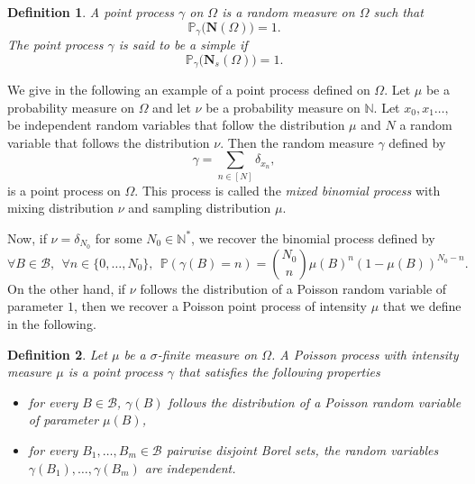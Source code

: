 \documentclass[twoside,11pt]{book}
\newtheorem{definition}{Definition}
\newtheorem{example}{Example}
\numberwithin{theorem}{chapter}
\numberwithin{definition}{chapter}
\numberwithin{proposition}{chapter}
\numberwithin{corollary}{chapter}
\numberwithin{example}{chapter}
\numberwithin{lemma}{chapter}
\begin{document}
\begin{definition}
A point process $\gamma$ on $\Omega$ is a random measure on $\Omega$ such that
\begin{equation}
\mathbb{P}_{\gamma} \big(\mathbf{N} (\Omega ) \big) = 1.
\end{equation}
The point process $\gamma$ is said to be a simple if 
\begin{equation}
\mathbb{P}_{\gamma}\big(\mathbf{N}_{s}(\Omega)\big) = 1.
\end{equation}

\end{definition}

We give in the following an example of a point process defined on $\Omega$. Let $\mu$ be a probability measure on $\Omega$ and let $\nu$ be a probability measure on $\mathbb{N}$. Let $x_{0}, x_{1} \dots, $ be independent random variables that follow the distribution $\mu$ and $N$ a random variable that follows the distribution $\nu$.
Then the random measure $\gamma$ defined by
\begin{equation}
\gamma = \sum\limits_{n \in [N]} \delta_{x_{n}},
\end{equation}
is a point process on $\Omega$. This process is called the \emph{mixed binomial process} with mixing distribution $\nu$ and sampling distribution $\mu$.

Now, if  $\nu = \delta_{N_0}$ for some $N_0 \in \mathbb{N}^{*}$, we recover the binomial process defined by
\begin{equation}\label{eq:binomial_cylinder_prb}
\forall B \in \mathcal{B}, \:\:\forall n \in \{0, \dots, N_0\}, \:\: \mathbb{P}(\gamma(B) = n) = \binom{N_0}{n}\mu(B)^{n}(1-\mu(B))^{N_0-n}.
\end{equation}
On the other hand, if $\nu$ follows the distribution of a Poisson random variable of parameter $1$, then we recover a Poisson point process of intensity $\mu$ that we define in the following.
\begin{definition}
Let $\mu$ be a $\sigma$-finite measure on $\Omega$. A Poisson process with intensity measure $\mu$ is a point process $\gamma$  that satisfies the following properties
\begin{itemize}
\item for every $B \in \mathcal{B}$, $\gamma(B)$ follows the distribution of a Poisson random variable of parameter $\mu(B)$,
\item for every $B_{1}, \dots, B_{m} \in \mathcal{B}$ pairwise disjoint Borel sets, the random variables $\gamma(B_{1}), \dots, \gamma(B_{m})$ are independent. 
\end{itemize}
\end{definition}
\end{document}
